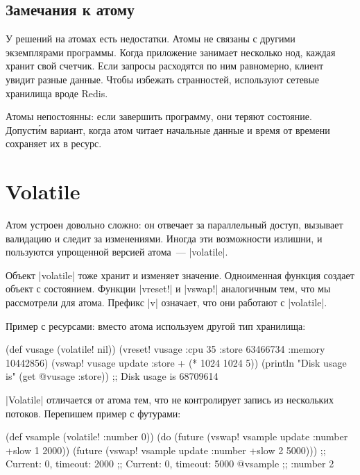 \subsection{Замечания к атому}

У решений на атомах есть недостатки. Атомы не связаны с другими экземплярами
программы. Когда приложение занимает несколько нод, каждая хранит свой
счетчик. Если запросы расходятся по ним равномерно, клиент увидит разные
данные. Чтобы избежать странностей, используют сетевые хранилища вроде Redis.

Атомы непостоянны: если завершить программу, они теряют состояние. Допуст\'{и}м
вариант, когда атом читает начальные данные и время от времени сохраняет их в
ресурс.

\section{Volatile}

Атом устроен довольно сложно: он отвечает за параллельный доступ, вызывает
валидацию и следит за изменениями. Иногда эти возможности излишни, и пользуются
упрощенной версией атома~--- \spverb|volatile|.

Объект \spverb|volatile| тоже хранит и изменяет значение. Одноименная функция
создает объект с состоянием. Функции \spverb|vreset!| и \spverb|vswap!|
аналогичным тем, что мы рассмотрели для атома. Префикс \spverb|v| означает, что
они работают с \spverb|volatile|.

Пример с ресурсами: вместо атома используем другой тип хранилища:

\begin{english}
  \begin{clojure}
(def vusage (volatile! nil))
(vreset! vusage
         {:cpu 35
          :store 63466734
          :memory 10442856})
(vswap! vusage update :store + (* 1024 1024 5))
(println "Disk usage is" (get @vusage :store))
;; Disk usage is 68709614
  \end{clojure}
\end{english}

\spverb|Volatile| отличается от атома тем, что не контролирует запись из
нескольких потоков. Перепишем пример с футурами:

\begin{english}
  \begin{clojure}
(def vsample (volatile! {:number 0}))
(do (future (vswap! vsample update :number +slow 1 2000))
    (future (vswap! vsample update :number +slow 2 5000)))
;; Current: 0, timeout: 2000
;; Current: 0, timeout: 5000
@vsample ;; {:number 2}
  \end{clojure}
\end{english}

